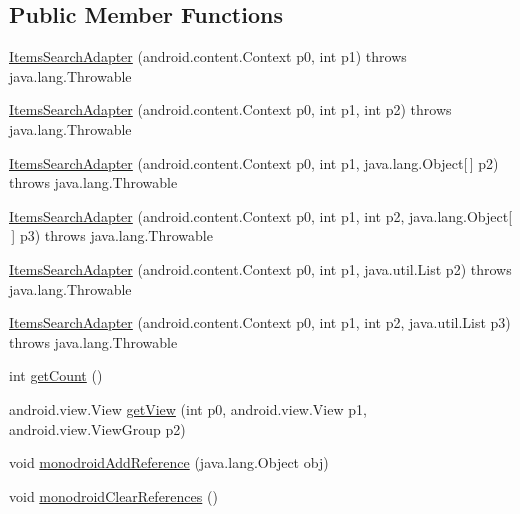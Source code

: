 \subsection*{Public Member Functions}
\begin{DoxyCompactItemize}
\item 
\hyperlink{classfieldservice_1_1android_1_1_items_search_adapter_a6504e372282aa8f2e28ccc6924df30fa}{Items\+Search\+Adapter} (android.\+content.\+Context p0, int p1)  throws java.\+lang.\+Throwable 	
\item 
\hyperlink{classfieldservice_1_1android_1_1_items_search_adapter_afd66fb28b635b9745ad77af8100b7b28}{Items\+Search\+Adapter} (android.\+content.\+Context p0, int p1, int p2)  throws java.\+lang.\+Throwable 	
\item 
\hyperlink{classfieldservice_1_1android_1_1_items_search_adapter_a8b47304e5608d8a9a43e65313d004f5f}{Items\+Search\+Adapter} (android.\+content.\+Context p0, int p1, java.\+lang.\+Object\mbox{[}$\,$\mbox{]} p2)  throws java.\+lang.\+Throwable 	
\item 
\hyperlink{classfieldservice_1_1android_1_1_items_search_adapter_a4aa71ff4335e6491eee38d51c21c2b8b}{Items\+Search\+Adapter} (android.\+content.\+Context p0, int p1, int p2, java.\+lang.\+Object\mbox{[}$\,$\mbox{]} p3)  throws java.\+lang.\+Throwable 	
\item 
\hyperlink{classfieldservice_1_1android_1_1_items_search_adapter_ab9fb5e32aa9563677add21657e8e96d6}{Items\+Search\+Adapter} (android.\+content.\+Context p0, int p1, java.\+util.\+List p2)  throws java.\+lang.\+Throwable 	
\item 
\hyperlink{classfieldservice_1_1android_1_1_items_search_adapter_a44a2075ccf11a8a26766f8d4730bff20}{Items\+Search\+Adapter} (android.\+content.\+Context p0, int p1, int p2, java.\+util.\+List p3)  throws java.\+lang.\+Throwable 	
\item 
int \hyperlink{classfieldservice_1_1android_1_1_items_search_adapter_aa4c1b5da76d113bf612ee29f7f996c01}{get\+Count} ()
\item 
android.\+view.\+View \hyperlink{classfieldservice_1_1android_1_1_items_search_adapter_a78abd16e15580d1020469f35fb5ea2f0}{get\+View} (int p0, android.\+view.\+View p1, android.\+view.\+View\+Group p2)
\item 
void \hyperlink{classfieldservice_1_1android_1_1_items_search_adapter_a9afc6778c995133af43168c744772285}{monodroid\+Add\+Reference} (java.\+lang.\+Object obj)
\item 
void \hyperlink{classfieldservice_1_1android_1_1_items_search_adapter_a769942d89bdca4f4a79b39d53e529585}{monodroid\+Clear\+References} ()
\end{DoxyCompactItemize}


